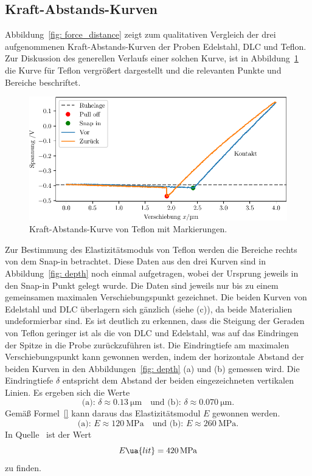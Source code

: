 \subsection{Kraft-Abstands-Kurven}
Abbildung~\ref{fig: force_distance} zeigt zum qualitativen Vergleich der drei aufgenommenen Kraft-Abstands-Kurven der Proben
Edelstahl, DLC und Teflon. Zur Diskussion des generellen Verlaufs einer solchen Kurve, ist in Abbildung~\ref{fig: force_distance_teflon} die Kurve
für Teflon vergrößert dargestellt und die relevanten Punkte und Bereiche beschriftet.
\begin{figure}
  \centering
  \includegraphics[scale = 1]{../analysis/data/force_distance/force_distance_teflon.pdf}
  \caption{Kraft-Abstands-Kurve von Teflon mit Markierungen.}
  \label{fig: force_distance_teflon}
\end{figure}



Zur Bestimmung des Elastizitätsmoduls von Teflon werden die Bereiche rechts von dem Snap-in betrachtet. Diese Daten aus den drei Kurven sind
in Abbildung~\ref{fig: depth} noch einmal aufgetragen, wobei der Ursprung jeweils in den Snap-in Punkt gelegt wurde. Die Daten sind
jeweils nur bis zu einem gemeinsamen maximalen Verschiebungspunkt gezeichnet.
Die beiden Kurven von Edelstahl und DLC überlagern sich gänzlich (siehe (c)), da beide Materialien undeformierbar sind.
Es ist deutlich zu erkennen, dass
die Steigung der Geraden von Teflon geringer ist als die von DLC und Edelstahl, was auf das Eindringen der Spitze in die Probe zurückzuführen ist.
Die Eindringtiefe am maximalen Verschiebungspunkt kann gewonnen werden, indem der horizontale Abstand der beiden Kurven in den Abbildungen~\ref{fig: depth}
(a) und (b) gemessen wird. Die Eindringtiefe $\delta$ entspricht dem Abstand der beiden eingezeichneten vertikalen Linien.
Es ergeben sich die Werte
\begin{equation}
  \text{(a): } \delta \approx \SI{0.13}{\micro\meter} \quad \text{und (b): }\delta \approx \SI{0.070}{\micro\meter}.
\end{equation}
Gemäß Formel~\eqref{} kann daraus das Elastizitätsmodul $E$ gewonnen werden.
\begin{equation}
  \text{(a): } E \approx \SI{120}{\mega \pascal} \quad \text{und (b): } E \approx \SI{260}{\mega \pascal}.
\end{equation}
In Quelle~\cite{} ist der Wert
\begin{equation}
  E\ua{lit} = \SI{420}{\mega \pascal}
\end{equation}
zu finden.

